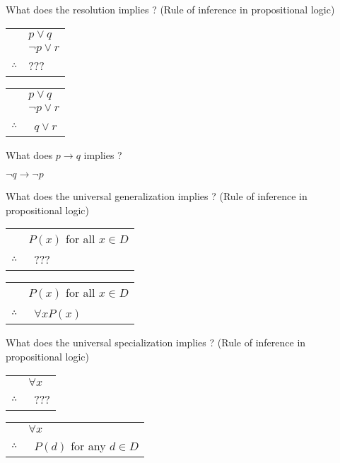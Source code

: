 \documentclass[12pt]{article}
\newcommand*{\xfield}[1]{\begin{mdframed}\centering #1\end{mdframed}\bigskip}
\newenvironment{note}{}{}
\begin{document}
\begin{note}
    \xfield{
        What does the resolution implies ? (Rule of inference in propositional logic) \begin{tabular}{c@{\,}l@{}}
        & $p \vee q$ \\
        & $\neg p \vee r$ \\
        \cline{2-2}    $\therefore$  & ???
        \end{tabular}
        }
    \xfield{
        \begin{tabular}{c@{\,}l@{}}
        & $p \vee q$ \\
        & $\neg p \vee r$ \\
        \cline{2-2}    $\therefore$         & \ $q \vee r$ \\  \end{tabular}
    }
\end{note}

\begin{note}
    \xfield{What does $p \to q$ implies ?}
    \xfield{$\neg q \to \neg p$}
\end{note}

\begin{note}
    \xfield{
        What does the universal generalization implies ? (Rule of inference in propositional logic) \begin{tabular}{c@{\,}l@{}}
        & $P(x)$ for all $x \in D$ \\\cline{2-2}    $\therefore$         & \ ??? \\  \end{tabular}
    }
    \xfield{ \begin{tabular}{c@{\,}l@{}}& $P(x)$ for all $x \in D$ \\\cline{2-2}    $\therefore$         & \ $\forall x P(x)$ \\  \end{tabular}}
\end{note}

\begin{note}
    \xfield{
        What does the universal specialization implies ? (Rule of inference in propositional logic) \begin{tabular}{c@{\,}l@{}}
        & $\forall x$ \\\cline{2-2}    $\therefore$         & \ ??? \\  \end{tabular}
    }
    \xfield{ \begin{tabular}{c@{\,}l@{}}& $\forall x$ \\\cline{2-2}    $\therefore$         & \ $P(d)$ for any $d \in D$ \\  \end{tabular}}
\end{note}
\end{document}
